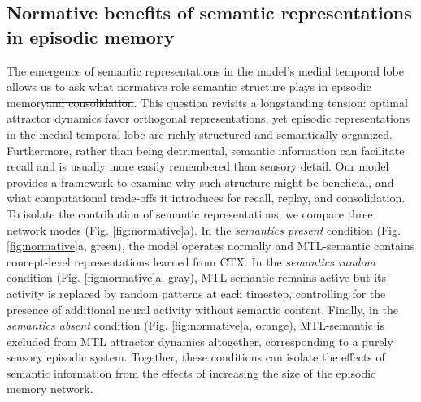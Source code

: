 \documentclass{article}
\providecommand{\DIFdeltex}[1]{{\protect\color{red}\sout{#1}}}                      %
\providecommand{\DIFdelbegin}{} %
\providecommand{\DIFdelend}{} %
\providecommand{\DIFdel}[1]{\texorpdfstring{\DIFdeltex{#1}}{}} %
\begin{document}
\subsection*{Normative benefits of semantic representations in episodic memory}
The emergence of semantic representations in the model’s medial temporal lobe allows us to ask what normative role semantic structure plays in episodic memory\DIFdelbegin \DIFdel{and consolidation}\DIFdelend . This question revisits a longstanding tension: optimal attractor dynamics favor orthogonal representations, yet episodic representations in the medial temporal lobe are richly structured and semantically organized. Furthermore, rather than being detrimental, semantic information can facilitate recall and is usually more easily remembered than sensory detail. Our model provides a framework to examine why such structure might be beneficial, and what computational trade-offs it introduces for recall, replay, and consolidation.
\newline\newline
To isolate the contribution of semantic representations, we compare three network modes (Fig. \ref{fig:normative}a). In the \textit{semantics present} condition (Fig. \ref{fig:normative}a, green), the model operates normally and MTL-semantic contains concept-level representations learned from CTX. In the \textit{semantics random} condition (Fig. \ref{fig:normative}a, gray), MTL-semantic remains active but its activity is replaced by random patterns at each timestep, controlling for the presence of additional neural activity without semantic content. Finally, in the \textit{semantics absent} condition (Fig. \ref{fig:normative}a, orange), MTL-semantic is excluded from MTL attractor dynamics altogether, corresponding to a purely sensory episodic system. Together, these conditions can isolate the effects of semantic information from the effects of increasing the size of the episodic memory network.
\end{document}
